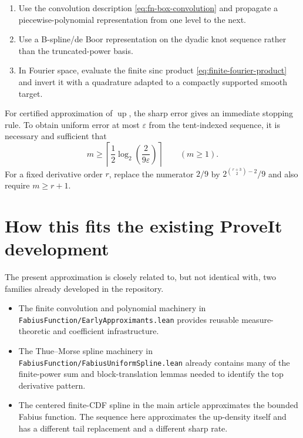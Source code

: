 \documentclass[11pt,oneside]{article}
\theoremstyle{definition}
\theoremstyle{remark}
\newcommand{\Up}{\operatorname{up}}
\newcommand{\ceil}[1]{\left\lceil#1\right\rceil}
\begin{document}
\begin{enumerate}[label=\textup{(\roman*)}]
\item Use the convolution description \eqref{eq:fn-box-convolution} and propagate a
piecewise-polynomial representation from one level to the next.
\item Use a B-spline/de Boor representation on the dyadic knot sequence rather than the
truncated-power basis.
\item In Fourier space, evaluate the finite sinc product \eqref{eq:finite-fourier-product}
and invert it with a quadrature adapted to a compactly supported smooth target.
\end{enumerate}

For certified approximation of $\Up$, the sharp error gives an immediate stopping rule.  To
obtain uniform error at most $\varepsilon$ from the tent-indexed sequence, it is necessary
and sufficient that
\begin{equation}
 m\ge
 \ceil{\frac12\log_2\left(\frac{2}{9\varepsilon}\right)}
 \qquad(m\ge1).
 \label{eq:stopping-rule}
\end{equation}
For a fixed derivative order $r$, replace the numerator $2/9$ by
$2^{\binom{r+3}{2}-2}/9$ and also require $m\ge r+1$.

\section{How this fits the existing ProveIt development}
\label{sec:formalization-roadmap}

The present approximation is closely related to, but not identical with, two families
already developed in the repository.

\begin{itemize}
\item The finite convolution and polynomial machinery in
\nolinkurl{FabiusFunction/EarlyApproximants.lean} provides reusable measure-theoretic and
coefficient infrastructure.
\item The Thue--Morse spline machinery in
\nolinkurl{FabiusFunction/FabiusUniformSpline.lean} already contains many of the finite-power
sum and block-translation lemmas needed to identify the top derivative pattern.
\item The centered finite-CDF spline in the main article approximates the bounded Fabius
function.  The sequence here approximates the up-density itself and has a different tail
replacement and a different sharp rate.
\end{itemize}
\end{document}
